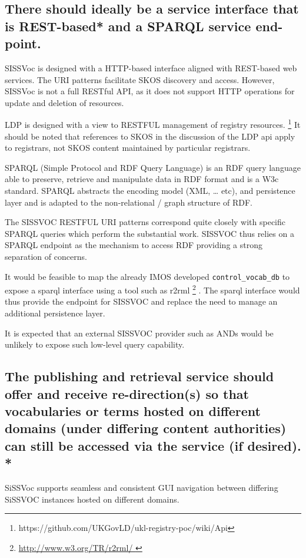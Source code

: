 \documentclass[10pt,a4paper]{article}
\begin{document}
\begin{flushleft}
\subsection{ 
  There should ideally be a service interface that is REST-based* and a SPARQL service end-point.
}

    SISSVoc is designed with a HTTP-based interface aligned with REST-based web
services. The URI patterns facilitate SKOS discovery and access. However,
SISSVoc is not a full RESTful API, as it does not support HTTP operations for
update and deletion of resources.
    
    LDP is designed with a view to RESTFUL management of registry resources.
\footnote { https://github.com/UKGovLD/ukl-registry-poc/wiki/Api } It should be
noted that references to SKOS in the discussion of the LDP api apply to
registrars, not SKOS content maintained by particular registrars.  


    SPARQL (Simple Protocol and RDF Query Language) is an RDF query language
able to preserve, retrieve and manipulate data in RDF format and is a W3c
standard.  SPARQL abstracts the encoding model (XML, … etc), and persistence
layer and is adapted to the non-relational / graph structure of RDF.

    The SISSVOC RESTFUL URI patterns correspond quite closely with specific SPARQL queries
which perform the substantial work. SISSVOC thus relies on a SPARQL endpoint as the
mechanism to access RDF providing a strong separation of concerns.

    It would be feasible to map the already IMOS developed
\texttt{control\_vocab\_db} to expose a sparql interface using a tool such as
r2rml \footnote{ \url{ http://www.w3.org/TR/r2rml/ } } .  The sparql interface
would thus provide the endpoint for SISSVOC and replace the need to manage an
additional persistence layer.

    It is expected that an external SISSVOC provider such as ANDs would be
unlikely to expose such low-level query capability.
   

\subsection{ The publishing and retrieval service should offer and receive
re-direction(s) so that vocabularies or terms hosted on different domains (under
differing content authorities) can still be accessed via the service (if
desired). * }

SiSSVoc supports seamless and consistent GUI navigation between differing
SiSSVOC instances hosted on different domains.


\end{flushleft}
\end{document}
